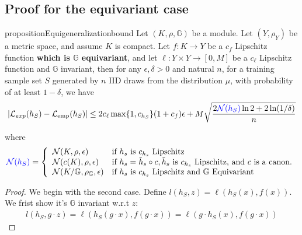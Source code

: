 \documentclass{article}
\theoremstyle{definition}
\theoremstyle{plain}
\newcommand{\G}{\mathbb{G}}
\newcommand{\N}{\mathcal{N}}
\newcommand{\Lemp}{\mathcal{L}_{\mathrm{emp}}}
\newcommand{\threepartdef}[6]
{
	\left\{
		\begin{array}{lll}
			#1 & \mbox{if } #2 \\
			#3 & \mbox{if } #4 \\
			#5 & \mbox{if } #6
		\end{array}
	\right.
}
\begin{document}
\subsection{Proof for the equivariant case}
\begin{restatable}{proposition}{Equigeneralizationbound}
Let $(K,\rho,\G)$ be a module. Let  $(Y,\rho_Y) $ be a metric space, and assume $K$ is compact. Let $f:K\to Y $ be a $c_f$  Lipschitz function \textbf{which is $\G $ equivariant}, and let $\ell:Y\times Y \to [0,M] $ be a $c_\ell $ Lipschitz function and $\G$ invariant, then for any $\epsilon,\delta>0$ and natural $n$,  for a training sample set $S$ generated by $n$ IID draws from the distribution $\mu$,  with probability of at least $ 1-\delta$, we have 
$$|\mathcal{L}_{exp}(h_S) - \Lemp(h_S)| \le 2c_\ell \max\{1,c_{h_S} \} (1+c_f)\epsilon+M \sqrt{\frac{2\textcolor{blue}{\N(h_S)} \ln 2 + 2 \ln(1/\delta)}{n}}$$

where 
\begin{equation}
\textcolor{blue}{\N(h_S)}=\threepartdef{\N(K,\rho,\epsilon)}{h_s \text{ is } c_{h_s} \text{ Lipschitz }}{\N(c(K),\rho,\epsilon)}{h_s=\tilde{h}_s\circ c, \tilde{h}_s \text { is } c_{h_s} \text{ Lipschitz, and }  c \text{ is a canon.}} {\N(K/\G,\rho_{\G},\epsilon)}{h_s \text{ is } c_{h_s} \text{ Lipschitz and  } \G \text{ Equivariant }} 
\end{equation}
\begin{proof}
    We begin with the second case. Define $l(h_S,z)=\ell(h_S(x),f(x))$. We frist show it's $\G$ invariant w.r.t $z$:
    \begin{align*}
        l(h_S,g\cdot z)=\ell(h_S(g\cdot x),f(g\cdot x)) = \ell(g\cdot h_S( x),f(g\cdot x))
    \end{align*}
\end{proof}
\end{restatable}
\end{document}
